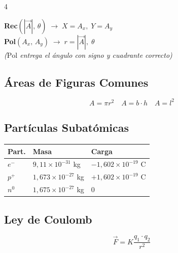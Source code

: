 \documentclass[9pt, landscape, letterpaper]{extarticle}
\begin{document}
\begin{multicols}{4}
  \begin{notabox}
    \centering\footnotesize
    \textbf{Rec}$(|\vec{A}|,\, \theta) \;\to\; X = A_x,\; Y = A_y$  \\[2pt]
    \textbf{Pol}$(A_x,\, A_y) \;\to\; r = |\vec{A}|,\; \theta$  \\[1pt]
    {\scriptsize\textit{($\mathrm{Pol}$ entrega el ángulo con signo y cuadrante correcto)}}
  \end{notabox}

  \subsection{Áreas de Figuras Comunes}

  \begin{formulabox}
    $$A = \pi r^2 \quad A = b \cdot h \quad A = l^2$$
  \end{formulabox}

  \subsection{Partículas Subatómicas}

  \begin{tablabox}
    \tablacompacta
    \begin{tabular}{@{}lll@{}}
      \toprule
      Part. & Masa                         & Carga                        \\
      \midrule
      $e^-$ & $9{,}11 \times 10^{-31}$ kg  & $-1{,}602 \times 10^{-19}$ C \\
      $p^+$ & $1{,}673 \times 10^{-27}$ kg & $+1{,}602 \times 10^{-19}$ C \\
      $n^0$ & $1{,}675 \times 10^{-27}$ kg & $0$                          \\
      \bottomrule
    \end{tabular}
  \end{tablabox}

  \subsection{Ley de Coulomb}

  \begin{formulabox}
    $$\vec{F} = K \frac{q_1 \cdot q_2}{r^2}$$
  \end{formulabox}


\end{multicols}
\end{document}
